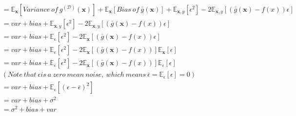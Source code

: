 \documentclass{article}
\begin{document}
\begin{align*}
        & = \mathbb{E}_{\mathbf{x}}[Variance \ of \ g^{(\mathcal{D})}(\mathbf{x})] + 
        \mathbb{E}_{\mathbf{x}}[Bias \ of \ \bar{g}(\mathbf{x})] + \mathbb{E}_{\mathbf{x},y}[\epsilon^2] - 
        2\mathbb{E}_{\mathbf{x},y}[(\bar{g}(\mathbf{x}) - f(x))\epsilon]\\
        & = var + bias + \mathbb{E}_{\mathbf{x},y}[\epsilon^2] - 
        2\mathbb{E}_{\mathbf{x},y}[(\bar{g}(\mathbf{x}) - f(x))\epsilon]\\
        & = var + bias + \mathbb{E}_{\epsilon}[\epsilon^2] - 
        2\mathbb{E}_{\mathbf{x}}[(\bar{g}(\mathbf{x}) - f(x))\epsilon]\\
        & = var + bias + \mathbb{E}_{\epsilon}[\epsilon^2] - 
        2\mathbb{E}_{\mathbf{x}}[(\bar{g}(\mathbf{x}) - f(x))]\mathbb{E}_{\mathbf{x}}[\epsilon]\\
        & = var + bias + \mathbb{E}_{\epsilon}[\epsilon^2] - 
        2\mathbb{E}_{\mathbf{x}}[(\bar{g}(\mathbf{x}) - f(x))]\mathbb{E}_{\epsilon}[\epsilon]\\
        & (Note \ that \ \epsilon is \ a \ zero \ mean \ noise, \ which \ means \  \bar{\epsilon} = 
        \mathbb{E}_{\epsilon}[\epsilon] = 0)\\
        & = var + bias + \mathbb{E}_{\epsilon}[(\epsilon - \bar{\epsilon})^2]\\
        & = var + bias + \sigma^2\\
        & = \sigma^2 + bias + var
    \end{align*}
\end{document}
